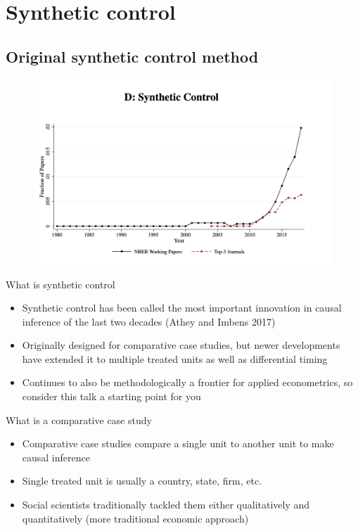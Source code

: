 \documentclass{beamer}
\begin{document}
\section{Synthetic control}

\subsection{Original synthetic control method}


\begin{frame}[plain]
	\begin{figure}
	\includegraphics[scale=0.25]{./lecture_includes/currie_synth.png}
	\end{figure}
\end{frame}

\begin{frame}{What is synthetic control}
	
	\begin{itemize}
	\item Synthetic control has been called the most important innovation in causal inference of the last two decades (Athey and Imbens 2017)
	\item Originally designed for comparative case studies, but newer developments have extended it to multiple treated units as well as differential timing
	\item Continues to also be methodologically a frontier for applied econometrics, so consider this talk a starting point for you
	\end{itemize}
\end{frame}
	
\begin{frame}{What is a comparative case study}

\begin{itemize}
\item Comparative case studies compare a single unit to another unit to make causal inference
\item Single treated unit is usually a country, state, firm, etc.
\item Social scientists traditionally tackled them either qualitatively and quantitatively (more traditional economic approach)
\end{itemize}

\end{frame}
\end{document}
